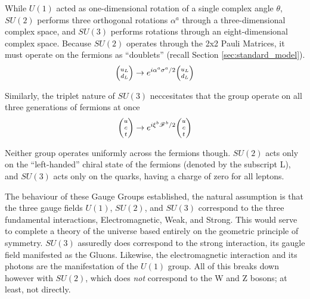     While $U(1)$ acted as one-dimensional rotation of a single complex angle $\theta$,
        $SU(2)$ performs three orthogonal rotations $\alpha^a$ through a three-dimensional complex space,
        and $SU(3)$ performs rotations through an eight-dimensional complex space.
    Because $SU(2)$ operates through the 2x2 Pauli Matrices, it must operate on the fermions as ``doublets''
        (recall Section \ref{sec:standard_model}).
    \begin{equation}
        \minimatrix{u_L \\ d_L} \to e^{i \alpha^a \sigma^a / 2} \minimatrix{u_L \\ d_L}
    \end{equation}

    Similarly, the triplet nature of $SU(3)$ neccesitates that the group operate on all three generations of fermions at once
    \begin{equation}
        \minimatrix{u\\c\\t} \to e^{i \xi^b \mathscr{F}^b / 2} \minimatrix{u\\c\\t}
    \end{equation}

    Neither group operates uniformly across the fermions though.
    $SU(2)$ acts only on the ``left-handed'' chiral state of the fermions (denoted by the subscript L),
        and $SU(3)$ acts only on the quarks, having a charge of zero for all leptons.

    The behaviour of these Gauge Groups established, the natural assumption is that the three gauge fields
        $U(1)$, $SU(2)$, and $SU(3)$ correspond to the three fundamental interactions,
        Electromagnetic, Weak, and Strong.
    This would serve to complete a theory of the universe based entirely on the geometric principle of symmetry.
    $SU(3)$ assuredly does correspond to the strong interaction, its gaugle field manifested as the Gluons.
    Likewise, the electromagnetic interaction and its photons are the manifestation of the $U(1)$ group. 
    All of this breaks down however with $SU(2)$, which does \textit{not} correspond to the W and Z bosons;
        at least, not directly.

